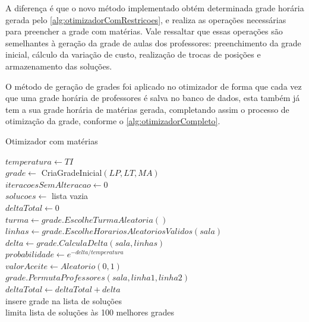 A diferença é que o novo método implementado obtém determinada grade horária gerada pelo \autoref{alg:otimizadorComRestricoes}, e realiza as operações necessárias para preencher a grade com matérias. Vale ressaltar que essas operações são semelhantes à geração da grade de aulas dos professores: preenchimento da grade inicial, cálculo da variação de custo, realização de trocas de posições e armazenamento das soluções.

O método de geração de grades foi aplicado no otimizador de forma que cada vez que uma grade horária de professores é salva no banco de dados, esta também já tem a sua grade horária de matérias gerada, completando assim o processo de otimização da grade, conforme o \autoref{alg:otimizadorCompleto}.

\begin{algorithm}
	\caption{Otimizador com matérias}
	\label{alg:otimizadorCompleto}
	$temperatura \leftarrow TI$\\
	$grade \leftarrow$ CriaGradeInicial$(LP, LT, MA)$\\
	$iteracoesSemAlteracao \leftarrow 0$\\
	$solucoes \leftarrow$ lista vazia\\
	 {
		$deltaTotal \leftarrow 0$\\
		 {
			$turma \leftarrow grade.EscolheTurmaAleatoria()$\\
			$linhas \leftarrow grade.EscolheHorariosAleatoriosValidos(sala)$\\
			$delta \leftarrow grade.CalculaDelta(sala, linhas)$\\
			$probabilidade \leftarrow e^{-delta/temperatura}$\\
			$valorAceite \leftarrow Aleatorio(0, 1)$\\
			 {
				$grade.PermutaProfessores(sala, linha1, linha2)$\\
				$deltaTotal \leftarrow deltaTotal + delta$\\
				 {
					insere grade na lista de soluções\\
					limita lista de soluções às 100 melhores grades\\
				}
			}
		}
		 {
}}
\end{algorithm}
